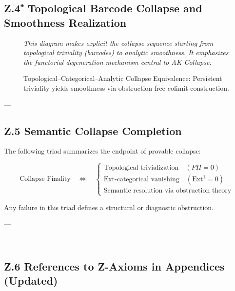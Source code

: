 \documentclass[11pt]{article}
\begin{document}
\begin{axiom}
\begin{axiom}
{{\subsection*{Z.4⁺ Topological Barcode Collapse and Smoothness Realization}

\begin{figure}[H]
\centering
{}

\caption{Topological–Categorical–Analytic Collapse Equivalence: Persistent triviality yields smoothness via obstruction-free colimit construction.}

\textit{This diagram makes explicit the collapse sequence starting from topological triviality (barcodes) to analytic smoothness.  
It emphasizes the functorial degeneration mechanism central to AK Collapse.}
\end{figure}

---

\subsection*{Z.5 Semantic Collapse Completion}

The following triad summarizes the endpoint of provable collapse:

\[
\text{Collapse Finality} \quad \Longleftrightarrow \quad
\begin{cases}
\text{Topological trivialization} \quad (PH = 0) \\
\text{Ext-categorical vanishing} \quad (\mathrm{Ext}^1 = 0) \\
\text{Semantic resolution via obstruction theory}
\end{cases}
\]

Any failure in this triad defines a structural or diagnostic obstruction.

---

-\subsection*{Z.6 References to Z-Axioms in Appendices (Updated)}

}}
\end{axiom}
\end{axiom}
\end{document}
